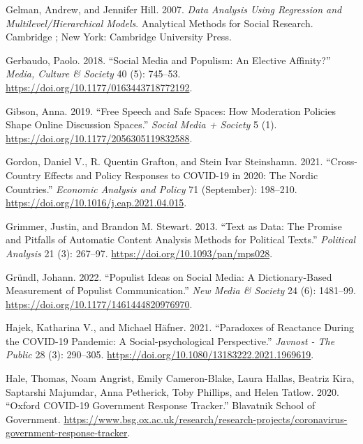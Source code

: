 \documentclass[
]{ccr}
\newlength{\cslhangindent}
\newlength{\cslentryspacingunit} %
\newenvironment{CSLReferences}[2] %
 {%
  \setlength{\parindent}{0pt}
  \ifodd #1
  \let\oldpar\par
  \def\par{\hangindent=\cslhangindent\oldpar}
  \fi
  \setlength{\parskip}{#2\cslentryspacingunit}
 }%
 {}
\begin{document}
\begin{CSLReferences}{1}{0}
\leavevmode{}%
Gelman, Andrew, and Jennifer Hill. 2007. \emph{Data Analysis Using
Regression and Multilevel/Hierarchical Models}. Analytical Methods for
Social Research. {Cambridge ; New York}: {Cambridge University Press}.

\leavevmode{}%
Gerbaudo, Paolo. 2018. {``Social Media and Populism: An Elective
Affinity?''} \emph{Media, Culture \& Society} 40 (5): 745--53.
\url{https://doi.org/10.1177/0163443718772192}.

\leavevmode{}%
Gibson, Anna. 2019. {``Free {Speech} and {Safe Spaces}: {How Moderation
Policies Shape Online Discussion Spaces}.''} \emph{Social Media +
Society} 5 (1). \url{https://doi.org/10.1177/2056305119832588}.

\leavevmode{}%
Gordon, Daniel V., R. Quentin Grafton, and Stein Ivar Steinshamn. 2021.
{``Cross-Country Effects and Policy Responses to {COVID-19} in 2020:
{The Nordic} Countries.''} \emph{Economic Analysis and Policy} 71
(September): 198--210. \url{https://doi.org/10.1016/j.eap.2021.04.015}.

\leavevmode{}%
Grimmer, Justin, and Brandon M. Stewart. 2013. {``Text as Data: {The}
Promise and Pitfalls of Automatic Content Analysis Methods for Political
Texts.''} \emph{Political Analysis} 21 (3): 267--97.
\url{https://doi.org/10.1093/pan/mps028}.

\leavevmode{}%
Gründl, Johann. 2022. {``Populist Ideas on Social Media: {A}
Dictionary-Based Measurement of Populist Communication.''} \emph{New
Media \& Society} 24 (6): 1481--99.
\url{https://doi.org/10.1177/1461444820976970}.

\leavevmode{}%
Hajek, Katharina V., and Michael Häfner. 2021. {``Paradoxes of
{Reactance During} the {COVID-19 Pandemic}: {A Social-psychological
Perspective}.''} \emph{Javnost - The Public} 28 (3): 290--305.
\url{https://doi.org/10.1080/13183222.2021.1969619}.

\leavevmode{}%
Hale, Thomas, Noam Angrist, Emily Cameron-Blake, Laura Hallas, Beatriz
Kira, Saptarshi Majumdar, Anna Petherick, Toby Phillips, and Helen
Tatlow. 2020. {``Oxford {COVID-19} Government Response Tracker.''}
{Blavatnik School of Government}.
\url{https://www.bsg.ox.ac.uk/research/research-projects/coronavirus-government-response-tracker}.


\end{CSLReferences}
\end{document}
